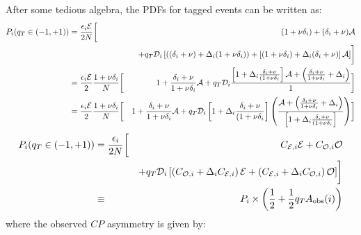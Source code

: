 \documentclass[a4paper,10pt,twosided]{article}
\begin{document}
After some tedious algebra, the PDFs for tagged events can be written as:
\begin{eqnarray}
  P_i(q_T\in (-1,+1))  &= \frac{\epsilon_i{\cal E}}{2N}\biggl[& (1+\nu\delta_i)+ (\delta_i+\nu){\cal A}   \nonumber
\\           &&+ q_T {\cal D}_i \left[ \left( (\delta_i+\nu) + {\Delta}_i (1+\nu\delta_i)\right) 
                                     + \left[ (1+\nu\delta_i) + {\Delta}_i (\delta_i +\nu) \right] {\cal A}  \right] \biggr] \nonumber
 \\                    &= \frac{\epsilon_i{\cal E}}{2}\frac{1+\nu\delta_i}{N}\biggl[&   1 + \frac{\delta_i+\nu}{1+\nu\delta_i}{\cal A}    \nonumber
               +  q_T {\cal D}_i \frac{\left[ 1 + {\Delta}_i \frac{\delta_i +\nu}{(1+\nu\delta_i}  \right] {\cal A}+ \left( \frac{\delta_i+\nu}{1+\nu\delta_i } + {\Delta}_i \right)  }{1} \biggr] \nonumber
 \\                    &= \frac{\epsilon_i{\cal E}}{2}\frac{1+\nu\delta_i}{N}\biggl[&   1 + \frac{\delta_i+\nu}{1+\nu\delta_i}{\cal A}    \nonumber
               +  q_T {\cal D}_i \left[ 1 + {\Delta}_i \frac{\delta_i +\nu}{(1+\nu\delta_i}  \right] \left( \frac{{\cal A}+ \left( \frac{\delta_i+\nu}{1+\nu\delta_i } + {\Delta}_i \right)  }{\left[ 1 + {\Delta}_i \frac{\delta_i +\nu}{(1+\nu\delta_i}  \right] }\right) \biggr] \nonumber
\end{eqnarray}
\begin{eqnarray}
  P_i(q_T\in (-1,+1))  &= \frac{\epsilon_i}{2N}\biggl[& C_{{\cal E},i}{\cal E} + C_{{\cal O},i}{\cal O}   \nonumber
\\           &&+ q_T {\cal D}_i \left[ \left( C_{{\cal O},i} + {\Delta}_i C_{{\cal E},i} \right) {\cal E} 
                                     + \left( C_{{\cal E},i} + {\Delta}_i C_{{\cal O},i} \right) {\cal O}  \right] \biggr] \nonumber
\\ &\equiv& P_i \times \left( \frac{ 1}{2} + \frac{1}{2} q_T A_{\mathrm{obs}}(i) \right)
\label{eq:substrule_e}
\end{eqnarray}
where the observed $CP$ asymmetry is given by:
\end{document}
